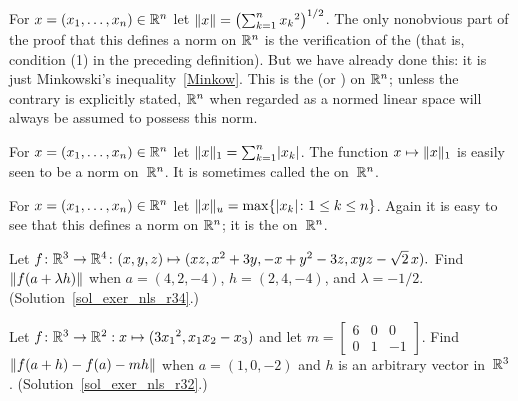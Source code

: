\begin{exam}  For $x = (x_1,\dots, x_n) \in \mathbb{R}^n$ let $\lVert x\rVert =
\left(\sum_{k=1}^n {x_k}^2\right)^{1/2}$.  The only nonobvious part of the proof that this
defines a norm on $\mathbb{R}^n$ is the verification of the
 (that is, condition (1) in the preceding definition).  But we have
already done this: it is just Minkowski's inequality~\ref{Minkow}.  This is the
 (or
) on $\mathbb{R}^n$; unless the contrary is explicitly stated, $\mathbb{R}^n$ when regarded
as a normed linear space will always be assumed to possess this norm.
\end{exam}

\begin{exam}  For $x = (x_1,\dots,x_n) \in \mathbb{R}^n$ let
$\lVert x\rVert_1 = \sum_{k=1}^n \lvert x_k\rvert$.  The function $x \mapsto \lVert x\rVert_1$ is easily seen to
be a norm on~$\mathbb{R}^n$. It is sometimes called
the  on~$\mathbb{R}^n$.
\end{exam}

\begin{exam}\label{exam_un_Rn}  For $x = (x_1,\dots,x_n) \in \mathbb{R}^n$ let
$\lVert x\rVert_u = \max\{\lvert x_k\rvert \colon 1 \le k \le n\}$.  Again it is easy to see that this
defines a norm on $\mathbb{R}^n$; it is the
 on~$\mathbb{R}^n$.
\end{exam}

\begin{exer}\label{exer_nls_r34}  Let $f \colon \mathbb{R}^3 \rightarrow \mathbb{R}^4 \colon (x,y,z) \mapsto
(xz, x^2 + 3y,-x + y^2 - 3z,xyz-\sqrt 2\,x).$ Find $\lVert f(a + \lambda h)\rVert$ when $a =
(4,2,-4)$, $h = (2,4,-4)$, and $\lambda = -1/2$.  (Solution~\ref{sol_exer_nls_r34}.)

\end{exer}

\begin{exer}\label{exer_nls_r32}  Let $f \colon  \mathbb{R}^3 \rightarrow \mathbb{R}^2: x \mapsto
(3{x_1}^2, x_1x_2 -x_3)$ and let $m = \begin{bmatrix}
                                               6 & 0 &  0 \\
                                               0 & 1 & -1
                                      \end{bmatrix}$.  Find $\lVert f(a + h) - f(a) - mh\rVert$ when
$a = (1, 0, -2)$ and $h$ is an arbitrary vector in~$\mathbb{R}^3$. (Solution~\ref{sol_exer_nls_r32}.)

\end{exer}

